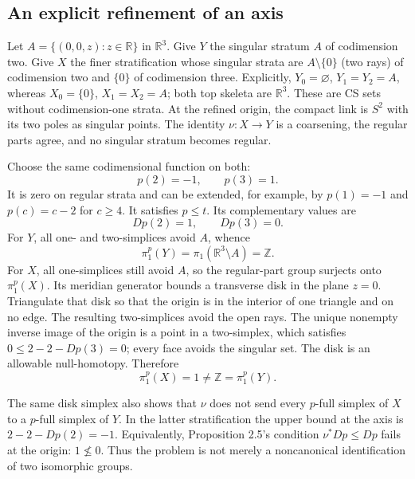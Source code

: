 \documentclass[10pt]{article}
\begin{document}
\subsection*{An explicit refinement of an axis}
Let \(A=\{(0,0,z):z\in\mathbb R\}\) in \(\mathbb R^3\). Give \(Y\) the singular stratum \(A\) of codimension two. Give \(X\) the finer stratification whose singular strata are \(A\setminus\{0\}\) (two rays) of codimension two and \(\{0\}\) of codimension three. Explicitly, \(Y_0=\varnothing\), \(Y_1=Y_2=A\), whereas \(X_0=\{0\}\), \(X_1=X_2=A\); both top skeleta are \(\mathbb R^3\). These are CS sets without codimension-one strata. At the refined origin, the compact link is \(S^2\) with its two poles as singular points. The identity \(\nu:X\to Y\) is a coarsening, the regular parts agree, and no singular stratum becomes regular.\par
Choose the same codimensional function on both: \[p(2)=-1,\qquad p(3)=1.\] It is zero on regular strata and can be extended, for example, by \(p(1)=-1\) and \(p(c)=c-2\) for \(c\geq4\). It satisfies \(p\leq t\). Its complementary values are \[Dp(2)=1,\qquad Dp(3)=0.\] For \(Y\), all one- and two-simplices avoid \(A\), whence \[\pi_1^p(Y)=\pi_1(\mathbb R^3\setminus A)=\mathbb Z.\] For \(X\), all one-simplices still avoid \(A\), so the regular-part group surjects onto \(\pi_1^p(X)\). Its meridian generator bounds a transverse disk in the plane \(z=0\). Triangulate that disk so that the origin is in the interior of one triangle and on no edge. The resulting two-simplices avoid the open rays. The unique nonempty inverse image of the origin is a point in a two-simplex, which satisfies \(0\leq2-2-Dp(3)=0\); every face avoids the singular set. The disk is an allowable null-homotopy. Therefore \[\pi_1^p(X)=1\ne\mathbb Z=\pi_1^p(Y).\]\par
The same disk simplex also shows that \(\nu\) does not send every \(p\)-full simplex of \(X\) to a \(p\)-full simplex of \(Y\). In the latter stratification the upper bound at the axis is \(2-2-Dp(2)=-1\). Equivalently, Proposition 2.5’s condition \(\nu^*Dp\leq Dp\) fails at the origin: \(1\nleq0\). Thus the problem is not merely a noncanonical identification of two isomorphic groups.\par
\end{document}
